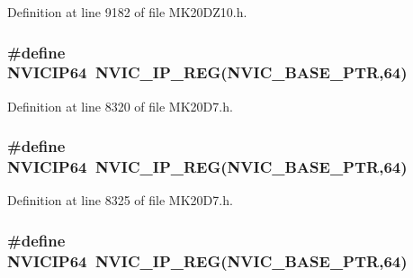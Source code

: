 Definition at line 9182 of file M\+K20\+D\+Z10.\+h.

\subsubsection[{\texorpdfstring{N\+V\+I\+C\+I\+P64}{NVICIP64}}]{\setlength{\rightskip}{0pt plus 5cm}\#define N\+V\+I\+C\+I\+P64~{\bf N\+V\+I\+C\+\_\+\+I\+P\+\_\+\+R\+EG}({\bf N\+V\+I\+C\+\_\+\+B\+A\+S\+E\+\_\+\+P\+TR},64)}\hypertarget{group___n_v_i_c___register___accessor___macros_ga4351d08f975bf064fa4f81d171d0df15}{}\label{group___n_v_i_c___register___accessor___macros_ga4351d08f975bf064fa4f81d171d0df15}


Definition at line 8320 of file M\+K20\+D7.\+h.

\subsubsection[{\texorpdfstring{N\+V\+I\+C\+I\+P64}{NVICIP64}}]{\setlength{\rightskip}{0pt plus 5cm}\#define N\+V\+I\+C\+I\+P64~{\bf N\+V\+I\+C\+\_\+\+I\+P\+\_\+\+R\+EG}({\bf N\+V\+I\+C\+\_\+\+B\+A\+S\+E\+\_\+\+P\+TR},64)}\hypertarget{group___n_v_i_c___register___accessor___macros_ga4351d08f975bf064fa4f81d171d0df15}{}\label{group___n_v_i_c___register___accessor___macros_ga4351d08f975bf064fa4f81d171d0df15}


Definition at line 8325 of file M\+K20\+D7.\+h.

\subsubsection[{\texorpdfstring{N\+V\+I\+C\+I\+P64}{NVICIP64}}]{\setlength{\rightskip}{0pt plus 5cm}\#define N\+V\+I\+C\+I\+P64~{\bf N\+V\+I\+C\+\_\+\+I\+P\+\_\+\+R\+EG}({\bf N\+V\+I\+C\+\_\+\+B\+A\+S\+E\+\_\+\+P\+TR},64)}\hypertarget{group___n_v_i_c___register___accessor___macros_ga4351d08f975bf064fa4f81d171d0df15}{}\label{group___n_v_i_c___register___accessor___macros_ga4351d08f975bf064fa4f81d171d0df15}


